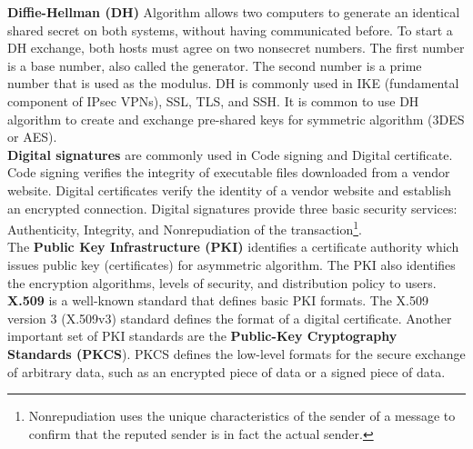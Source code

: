 \textbf{Diffie-Hellman (DH)} Algorithm allows two computers to generate an identical shared secret on both systems, without having communicated before.  To start a DH exchange, both hosts must agree on two nonsecret numbers. The first number is a base number, also called the generator. The second number is a prime number that is used as the modulus. DH is commonly used in IKE (fundamental component of IPsec VPNs), SSL, TLS, and SSH. It is common to use DH algorithm to create and exchange pre-shared keys for symmetric algorithm (3DES or AES).\\

\textbf{Digital signatures} are commonly used in Code signing and Digital certificate. Code signing verifies the integrity of executable files downloaded from a vendor website. Digital certificates verify the identity of a vendor website and establish an encrypted connection. Digital signatures provide three basic security services: Authenticity, Integrity, and Nonrepudiation of the transaction\footnote{Nonrepudiation uses the unique characteristics of the sender of a message to confirm that the reputed sender is in fact the actual sender.}.\\

The \textbf{Public Key Infrastructure (PKI)} identifies a certificate authority which issues public key (certificates) for asymmetric algorithm. The PKI also identifies the encryption algorithms, levels of security, and distribution policy to users. \textbf{X.509} is a well-known standard that defines basic PKI formats. The X.509 version 3 (X.509v3) standard defines the format of a digital certificate. Another important set of PKI standards are the \textbf{Public-Key Cryptography Standards (PKCS}). PKCS defines the low-level formats for the secure exchange of arbitrary data, such as an encrypted piece of data or a signed piece of data.\\

